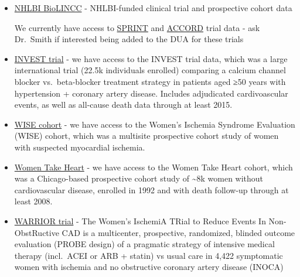 \documentclass[
  letterpaper,
  DIV=11,
  numbers=noendperiod]{scrreprt}
\begin{document}
\begin{itemize}
\item
  \href{https://biolincc.nhlbi.nih.gov/home/}{NHLBI BioLINCC} -
  NHLBI-funded clinical trial and prospective cohort data

  \begin{tcolorbox}[enhanced jigsaw, colframe=quarto-callout-note-color-frame, opacityback=0, leftrule=.75mm, bottomrule=.15mm, rightrule=.15mm, left=2mm, toptitle=1mm, colback=white, bottomtitle=1mm, titlerule=0mm, title=\textcolor{quarto-callout-note-color}{\faInfo}\hspace{0.5em}{Note}, arc=.35mm, toprule=.15mm, breakable, coltitle=black, colbacktitle=quarto-callout-note-color!10!white, opacitybacktitle=0.6]

  We currently have access to
  \href{https://www.nejm.org/doi/full/10.1056/nejmoa1511939}{SPRINT} and
  \href{https://www.nejm.org/doi/full/10.1056/nejmoa1001286}{ACCORD}
  trial data - ask Dr.~Smith if interested being added to the DUA for
  these trials

  \end{tcolorbox}
\item
  \href{https://jamanetwork.com/journals/jama/fullarticle/197761}{INVEST
  trial} - we have access to the INVEST trial data, which was a large
  international trial (22.5k individuals enrolled) comparing a calcium
  channel blocker vs.~beta-blocker treatment strategy in patients aged
  ≥50 years with hypertension + coronary artery disease. Includes
  adjudicated cardivoascular events, as well as all-cause death data
  through at least 2015.
\item
  \href{https://www.sciencedirect.com/science/article/pii/S0735109799000820?via\%3Dihub}{WISE
  cohort} - we have access to the Women's Ischemia Syndrome Evaluation
  (WISE) cohort, which was a multisite prospective cohort study of women
  with suspected myocardial ischemia.
\item
  \href{https://jamanetwork.com/journals/jamainternalmedicine/fullarticle/414930}{Women
  Take Heart} - we have access to the Women Take Heart cohort, which was
  a Chicago-based prospective cohort study of \textasciitilde8k women
  without cardiovascular disease, enrolled in 1992 and with death
  follow-up through at least 2008.
\item
  \href{https://www.sciencedirect.com/science/article/abs/pii/S0002870321000776?via\%3Dihub}{WARRIOR
  trial} - The Women's IschemiA TRial to Reduce Events In
  Non-ObstRuctive CAD is a multicenter, prospective, randomized, blinded
  outcome evaluation (PROBE design) of a pragmatic strategy of intensive
  medical therapy (incl.~ACEI or ARB + statin) vs usual care in 4,422
  symptomatic women with ischemia and no obstructive coronary artery
  disease (INOCA)
\end{itemize}
\end{document}
